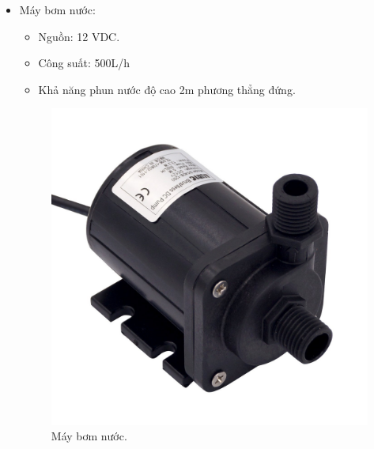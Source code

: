 \documentclass[a4paper,12pt,oneside]{article}
\begin{document}
\begin{itemize}


\item Máy bơm nước:
\begin{itemize}
\item Nguồn: 12 VDC.
\item Công suất: 500L/h
\item Khả năng phun nước độ cao 2m phương thẳng đứng.
\end{itemize}
\begin{figure}[h!]
\begin{center}
\includegraphics[scale=0.1]{hinh/pump.jpg}
\end{center}
\caption{Máy bơm nước.}
\end{figure}


\end{itemize}
\end{document}
